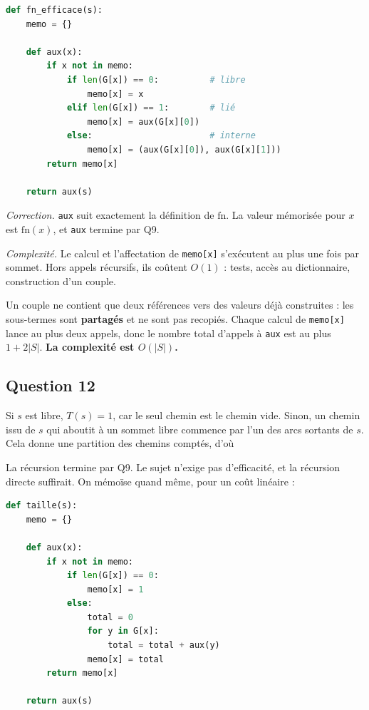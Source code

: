 \documentclass[11pt,a4paper]{article}
\newcommand{\equationajustee}[1]{%
  \sbox{\boiteequation}{$\displaystyle #1$}%
  \ifdim\wd\boiteequation>\linewidth
    \[\resizebox{\linewidth}{!}{\usebox{\boiteequation}}\]%
  \else
    \[#1\]%
  \fi}
\begin{document}
\begin{lstlisting}[language=Python]
def fn_efficace(s):
    memo = {}

    def aux(x):
        if x not in memo:
            if len(G[x]) == 0:          # libre
                memo[x] = x
            elif len(G[x]) == 1:        # lié
                memo[x] = aux(G[x][0])
            else:                       # interne
                memo[x] = (aux(G[x][0]), aux(G[x][1]))
        return memo[x]

    return aux(s)
\end{lstlisting}

\emph{Correction.} \texttt{aux} suit exactement la définition de \(\mathrm{fn}\). La valeur mémorisée pour \(x\) est \(\mathrm{fn}(x)\), et \texttt{aux} termine par Q9.

\emph{Complexité.} Le calcul et l'affectation de \texttt{memo{[}x{]}} s'exécutent au plus une fois par sommet. Hors appels récursifs, ils coûtent \(O(1)\) : tests, accès au dictionnaire, construction d'un couple.

Un couple ne contient que deux références vers des valeurs déjà construites : les sous-termes sont \textbf{partagés} et ne sont pas recopiés. Chaque calcul de \texttt{memo{[}x{]}} lance au plus deux appels, donc le nombre total d'appels à \texttt{aux} est au plus \(1+2|S|\). \textbf{La complexité est \(O(|S|)\).}

\hypertarget{question-12}{%
\subsection{Question 12}\label{question-12}}

Si \(s\) est libre, \(T(s)=1\), car le seul chemin est le chemin vide. Sinon, un chemin issu de \(s\) qui aboutit à un sommet libre commence par l'un des arcs sortants de \(s\). Cela donne une partition des chemins comptés, d'où

\equationajustee{T(s)=\sum_{s\to t}T(t).}

La récursion termine par Q9. Le sujet n'exige pas d'efficacité, et la récursion directe suffirait. On mémoïse quand même, pour un coût linéaire :

\begin{lstlisting}[language=Python]
def taille(s):
    memo = {}

    def aux(x):
        if x not in memo:
            if len(G[x]) == 0:
                memo[x] = 1
            else:
                total = 0
                for y in G[x]:
                    total = total + aux(y)
                memo[x] = total
        return memo[x]

    return aux(s)
\end{lstlisting}
\end{document}

